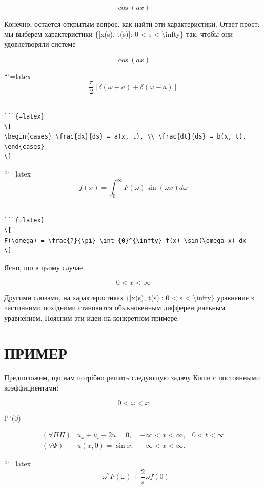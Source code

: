 \documentclass[
]{article}
\begin{document}
\[
\cos(ax)
\]

Конечно, остается открытым вопрос, как найти эти характеристики. Ответ
прост: мы выберем характеристики \{{[}x(s), t(s){]}: 0 \textless{} s
\textless{} \textbackslash infty\} так, чтобы они удовлетворяли системе

\[
\cos(ax)
\]

```{=latex}
\[
\frac{\pi}{2} [\delta(\omega+a) + \delta(\omega-a)]
\]

\begin{verbatim}

```{=latex}
\[
\begin{cases} \frac{dx}{ds} = a(x, t), \\ \frac{dt}{ds} = b(x, t). \end{cases}
\]
\end{verbatim}

```{=latex}
\[
f(x) = \int_{0}^{\infty} F(\omega) \sin(\omega x) d\omega
\]

\begin{verbatim}

```{=latex}
\[
F(\omega) = \frac{?}{\pi} \int_{0}^{\infty} f(x) \sin(\omega x) dx
\]
\end{verbatim}

Ясно, що в цьому случае

\[
0 < x < \infty
\]

Другими словами, на характеристиках \{{[}x(s), t(s){]}: 0 \textless{} s
\textless{} \textbackslash infty\} уравнение з частинними похідними
становится обыкновенным дифференциальным уравнением. Поясним эти идеи на
конкретном примере.

\section{ПРИМЕР}\label{ux43fux440ux438ux43cux435ux440}

Предположим, що нам потрібно решить следующую задачу Коши с постоянными
коэффициентами:

\[
0 < \omega < x
\]

f'\,'(0)

\[
\begin{aligned} (\forall \Pi \Pi) & u_x + u_t + 2u = 0, & -\infty < x < \infty, & 0 < t < \infty \\ (\forall \Psi) & u(x, 0) = \sin x, & -\infty < x < \infty. \end{aligned}
\]

```{=latex}
\[
-\omega^2 F(\omega) + \frac{2}{\pi} \omega f(0)
\]
\end{document}
